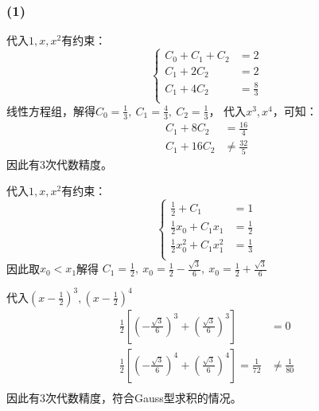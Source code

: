 \documentclass[UTF8,zihao=5]{ctexart}
\begin{document}
\subsubsection*{(1)}

代入$1,x,x^2$有约束：
$$
    \left\{
    \begin{array}{rl}
        C_0 + C_1 + C_2 & = 2          \\
        C_1 + 2C_2      & =2           \\
        C_1 + 4C_2      & =\frac{8}{3} \\
    \end{array}
    \right.
$$
线性方程组，解得$C_0=\frac{1}{3},\ C_1=\frac{4}{3},\ C_2=\frac{1}{3}$，
代入$x^3,x^4$，可知：
$$
    \begin{aligned}
        C_1+8C_2  & =\frac{16}{4}    \\
        C_1+16C_2 & \neq\frac{32}{5}
    \end{aligned}
$$
因此有3次代数精度。

代入$1,x,x^2$有约束：
$$
    \left\{
    \begin{array}{rl}
        \frac{1}{2} + C_1           & = 1          \\
        \frac{1}{2}x_0 + C_1x_1     & =\frac{1}{2} \\
        \frac{1}{2}x_0^2 + C_1x_1^2 & =\frac{1}{3} \\
    \end{array}
    \right.
$$
因此取$x_0<x_1$解得
$C_1=\frac{1}{2},\ x_0=\frac{1}{2}-\frac{\sqrt{3}}{6},\ x_0=\frac{1}{2}+\frac{\sqrt{3}}{6}$

代入$(x-\frac{1}{2})^3,(x-\frac{1}{2})^4$
$$
    \begin{aligned}
        \frac{1}{2}\left[\left(
            -\frac{\sqrt{3}}{6}
            \right)^3+
            \left(
            \frac{\sqrt{3}}{6}
        \right)^3\right]               & =0                \\
        \frac{1}{2}\left[\left(
            -\frac{\sqrt{3}}{6}
            \right)^4+
            \left(
            \frac{\sqrt{3}}{6}
        \right)^4\right] =\frac{1}{72} & \neq \frac{1}{80} \\
    \end{aligned}
$$
因此有3次代数精度，符合Gauss型求积的情况。
\end{document}

